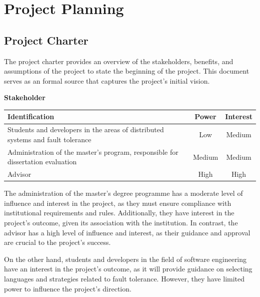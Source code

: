 % 
\chapter{Project Planning} %
\label{chap:ProjectPlan}


\section{Project Charter}

The project charter provides an overview of the stakeholders, benefits, and assumptions of the project to state the beginning of the project. This document serves as an formal source that captures the project's initial vision.

\noindent \textbf{Stakeholder}

\begin{table}[h!]
      \centering
      \begin{tabular}{|p{11cm}|c|c|}
            \hline
            \textbf{Identification}                                                         & \textbf{Power} & \textbf{Interest} \\ \hline
            Students and developers in the areas of distributed systems and fault tolerance & Low            & Medium            \\ \hline
            Administration of the master's program, responsible for dissertation evaluation & Medium         & Medium            \\ \hline
            Advisor                                                                         & High           & High              \\ \hline
      \end{tabular}
\end{table}

The administration of the master's degree programme has a moderate level of influence and interest in the project, as they must ensure compliance with institutional requirements and rules. Additionally, they have interest in the project's outcome, given its association with the institution. In contrast, the advisor has a high level of influence and interest, as their guidance and approval are crucial to the project's success. 

On the other hand, students and developers in the field of software engineering have an interest in the project's outcome, as it will provide guidance on selecting languages and strategies related to fault tolerance. However, they have limited power to influence the project's direction.

